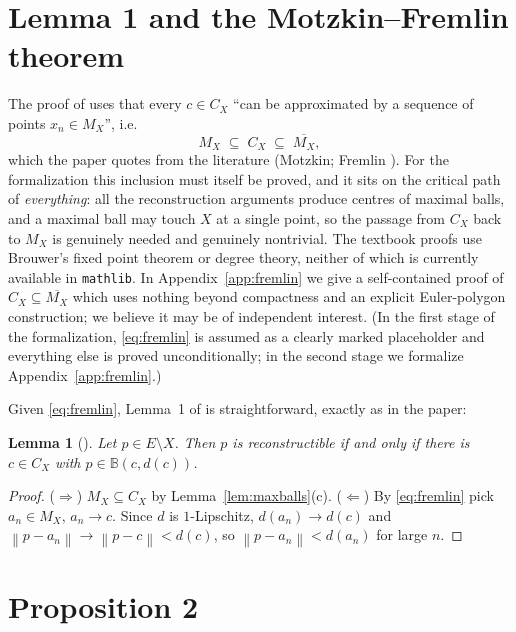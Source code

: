 \documentclass[11pt]{article}
\newtheorem{lemma}[theorem]{Lemma}
\theoremstyle{remark}
\newcommand{\B}{\mathbb{B}}
\newcommand{\X}{X}
\newcommand{\norm}[1]{\left\lVert #1\right\rVert}
\newcommand{\Mx}{M_{\X}}
\newcommand{\Cx}{C_{\X}}
\begin{document}
\section{Lemma 1 and the Motzkin--Fremlin theorem}\label{sec:fremlin}

The proof of \cite[Lemma~1]{Bia} uses that every $c\in\Cx$ ``can be approximated by a sequence of
points $x_n\in\Mx$'', i.e.
\begin{equation}\label{eq:fremlin}
 \Mx\;\subseteq\;\Cx\;\subseteq\;\overline{\Mx},
\end{equation}
which the paper quotes from the literature (Motzkin; Fremlin \cite{Fre}). For the formalization
this inclusion must itself be proved, and it sits on the critical path of \emph{everything}: all
the reconstruction arguments produce centres of maximal balls, and a maximal ball may touch $\X$
at a single point, so the passage from $\Cx$ back to $\Mx$ is genuinely needed and genuinely
nontrivial. The textbook proofs use Brouwer's fixed point theorem or degree theory, neither of
which is currently available in \texttt{mathlib}. In Appendix~\ref{app:fremlin} we give a
self-contained proof of $\Cx\subseteq\overline{\Mx}$ which uses nothing beyond compactness and an
explicit Euler-polygon construction; we believe it may be of independent interest. (In the first
stage of the formalization, \eqref{eq:fremlin} is assumed as a clearly marked placeholder and
everything else is proved unconditionally; in the second stage we formalize
Appendix~\ref{app:fremlin}.)

Given \eqref{eq:fremlin}, Lemma~1 of \cite{Bia} is straightforward, exactly as in the paper:

\begin{lemma}[{\cite[Lemma~1]{Bia}}]\label{lem:one}
Let $p\in E\setminus \X$. Then $p$ is reconstructible if and only if there is $c\in\Cx$ with
$p\in\B(c,d(c))$.
\end{lemma}

\begin{proof}
($\Rightarrow$) $\Mx\subseteq\Cx$ by Lemma~\ref{lem:maxballs}(c).
($\Leftarrow$) By \eqref{eq:fremlin} pick $a_n\in\Mx$, $a_n\to c$. Since $d$ is $1$-Lipschitz,
$d(a_n)\to d(c)$ and $\norm{p-a_n}\to\norm{p-c}<d(c)$, so $\norm{p-a_n}<d(a_n)$ for large $n$.
\end{proof}

\section{Proposition 2}\label{sec:prop2}
\end{document}
